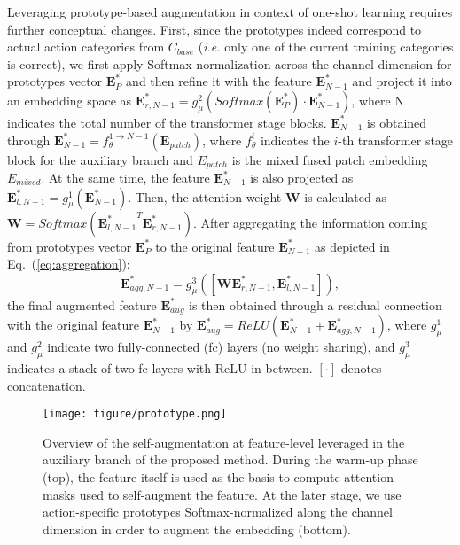 \documentclass[lettersize,journal]{IEEEtran}
\begin{document}
Leveraging prototype-based augmentation in context of one-shot learning requires further conceptual changes. 
First, since the prototypes indeed correspond to actual action categories from $C_{base}$ (\textit{i.e.} only one of the current training categories is correct), we first apply Softmax normalization across the channel dimension for prototypes vector $\textbf{E}_{P}^{*}$ and then refine it with the feature $\textbf{E}_{N-1}^{*}$ and project it into an embedding space as $\textbf{E}_{r, N-1}^{*}{=}g_{\mu}^{2}(Softmax(\textbf{E}_{P}^{*}) \cdot \textbf{E}_{N-1}^{*})$, where N indicates the total number of the transformer stage blocks. $\textbf{E}_{N-1}^{*}$ is obtained through $\textbf{E}_{N-1}^*={f_{\theta}^{1 \to N-1}}(\textbf{E}_{patch})$, where $f_{\theta}^{i}$ indicates the $i$-th transformer stage block for the auxiliary branch and $E_{patch}$ is the mixed fused patch embedding $E_{mixed}$.
At the same time, the feature $\textbf{E}_{N-1}^{*}$ is also projected as $\textbf{E}_{l, N-1}^{*} {=} g_{\mu}^{1}(\textbf{E}_{N-1}^{*})$. Then, the attention weight $\textbf{W}$ is calculated as $\textbf{W} {=} Softmax({\textbf{E}_{l, N-1}^{*}}^{T} \textbf{E}_{r,N-1}^{*})$. After aggregating the information coming from prototypes vector $\textbf{E}_{P}^{*}$ to the original feature $\textbf{E}_{N-1}^{*}$ as depicted in Eq.~(\ref{eq:aggregation}): 
\begin{equation}
\label{eq:aggregation}
  \mathbf{E}_{agg, N-1}^{*}=g_{\mu}^{3}([\mathbf{W}\mathbf{E}_{r, N-1}^{*}, \mathbf{E}_{l, N-1}^{*}]),
\end{equation}
the final augmented feature $\textbf{E}_{aug}^*$ is then obtained through a residual connection with the original feature $\textbf{E}_{N-1}^*$ by $\textbf{E}_{aug}^* {=} ReLU(\textbf{E}_{N-1}^*{+} \textbf{E}_{agg, N-1}^*)$, where $g_{\mu}^1$ and $g_{\mu}^2$ indicate two fully-connected (fc) layers (no weight sharing), and $g_{\mu}^3$ indicates a stack of two fc layers with ReLU in between. $[\cdot]$ denotes concatenation. 
\begin{figure}[t]
\begin{center}
\texttt{[image: figure/prototype.png]}
\end{center}
\caption{Overview of the self-augmentation at feature-level leveraged in the auxiliary branch of the proposed method. During the warm-up phase (top), the feature itself is used as the basis to compute attention masks used to self-augment the feature. At the later stage, we use action-specific prototypes Softmax-normalized along the channel dimension in order to augment the embedding (bottom). 
}
\label{fig:augmentation}
\end{figure}
\end{document}
